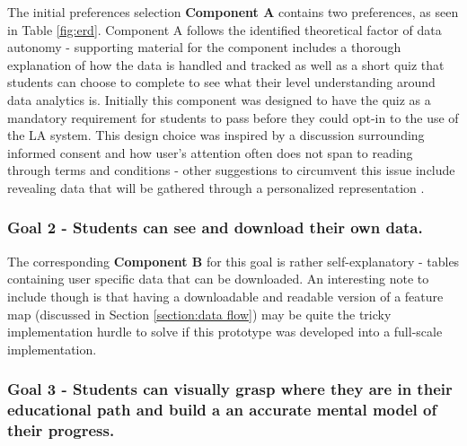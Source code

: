 \documentclass{l4proj}
\begin{document}
The initial preferences selection \textbf{Component A} contains two preferences, as seen in Table \ref{fig:erd}. Component A follows the identified theoretical factor of data autonomy - supporting material for the component includes a thorough explanation of how the data is handled and tracked as well as a short quiz that students can choose to complete to see what their level understanding around data analytics is. Initially this component was designed to have the quiz as a mandatory requirement for students to pass before they could opt-in to the use of the LA system. This design choice was inspired by a discussion surrounding informed consent and how user's attention often does not span to reading through terms and conditions - other suggestions to circumvent this issue include revealing data that will be gathered through a personalized representation \citep{morrison2011informed}. 


\subsubsection{Goal 2 - Students can see and download their own data. }
\hfill

The corresponding \textbf{Component B} for this goal is rather self-explanatory - tables containing user specific data that can be downloaded. An interesting note to include though is that having a downloadable and readable version of a feature map (discussed in Section \ref{section:data flow}) may be quite the tricky implementation hurdle to solve if this prototype was developed into a full-scale implementation. 

\subsubsection{Goal 3 - Students can visually grasp where they are in their educational path and build a an accurate mental model of their progress. }
\hfill
\end{document}
